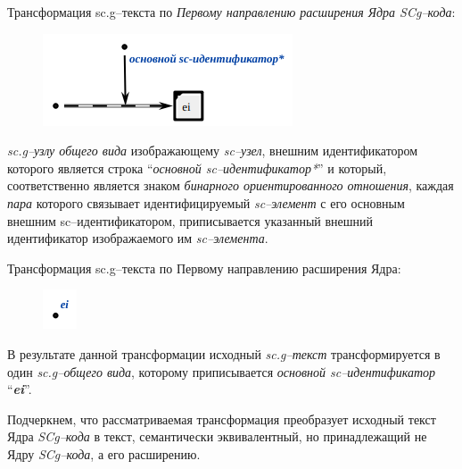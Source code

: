 \bigskip
Трансформация sc.g--текста по \textit{Первому направлению расширения Ядра SCg--кода}:
\begin{figure}[h]
	\centering
	\includegraphics[scale=0.8]{images/intro/scg/scg_transf2.png}
\end{figure}
\textit{sc.g--узлу общего вида} изображающему \textit{sc--узел}, внешним идентификатором которого является строка ``\textit{основной sc--идентификатор*}'' и который, соответственно является знаком \textit{бинарного ориентированного отношения}, каждая \textit{пара} которого связывает идентифицируемый \textit{sc--элемент} с его основным внешним sc--идентификатором, приписывается указанный внешний идентификатор изображаемого им \textit{sc--элемента}.

\bigskip
Трансформация sc.g--текста по Первому направлению расширения Ядра:
\begin{figure}[h]
	\centering
	\includegraphics[scale=0.8]{images/intro/scg/scg_transf3.png}
\end{figure}

В результате данной трансформации исходный \mbox{\textit{sc.g--текст}} трансформируется в один \textit{sc.g--общего вида}, которому приписывается \textit{основной sc--идентификатор} ``\textit{\textbf{ei}}''.

Подчеркнем, что рассматриваемая трансформация преобразует исходный текст Ядра \textit{SCg--кода} в текст, семантически эквивалентный, но принадлежащий не Ядру \textit{SCg--кода}, а его расширению.





